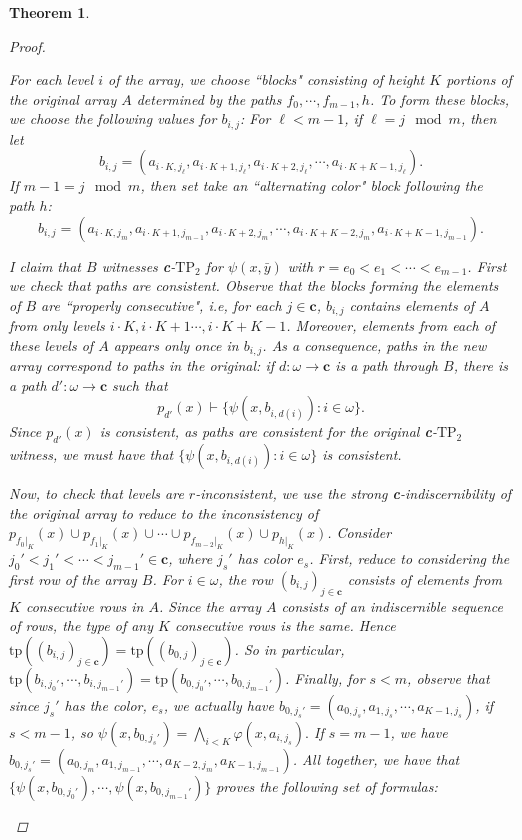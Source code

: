 \documentclass{article}
\newcommand{\tp}{\text{tp}}
\newcommand{\TPii}{\text{TP}_2}
\newcommand{\vphi}{\varphi}
\newtheorem{theorem}{Theorem}
\theoremstyle{definition}
\theoremstyle{definition}
\theoremstyle{definition}
\theoremstyle{definition}
\begin{document}
\begin{theorem}
\begin{proof}
\begin{enumerate}
        For each level $i$ of the array, we choose ``blocks" consisting of height $K$ portions of the original array $A$ determined by the paths $f_0,\dotsm, f_{m-1}, h$. To form these blocks, we choose the following values for $b_{i,j}$: For $\ell< m-1$, if $\ell=j\mod m$, then let $$b_{i,j}=(a_{i\cdot K, j_\ell},a_{i\cdot K+1,j_\ell}, a_{i\cdot K+2, j_\ell},\dotsm, a_{i\cdot K+K-1,j_\ell}).$$ If $m-1=j\mod m$, then set take an ``alternating color" block following the path $h$: $$b_{i,j}=(a_{i\cdot K, j_m},a_{i\cdot K+1,j_{m-1}}, a_{i\cdot K+2, j_m},\dotsm, a_{i\cdot K+K-2,j_m}, a_{i\cdot K+K-1, j_{m-1}}).$$

        I claim that $B$ witnesses \textbf{c}-$\TPii$ for $\psi(x,\bar{y})$ with $r=e_0<e_1<\dotsm<e_{m-1}$. First we check that paths are consistent. Observe that the blocks forming the elements of $B$ are ``properly consecutive", i.e, for each $j\in \textbf{c}$, $b_{i,j}$ contains elements of $A$ from only levels $i\cdot K, i\cdot K+1\dotsm, i\cdot K+K-1$. Moreover, elements from each of these levels of $A$ appears only once in $b_{i,j}$. As a consequence, paths in the new array correspond to paths in the original: if $d\colon \omega\to \textbf{c}$ is a path through $B$, there is a path $d'\colon \omega\to \textbf{c}$ such that $$p_{d'}(x)\vdash\{\psi(x, b_{i,d(i)})\colon i\in \omega\}.$$ Since $p_{d'}(x)$ is consistent, as paths are consistent for the original \textbf{c}-$\TPii$ witness, we must have that $\{\psi(x, b_{i,d(i)})\colon i\in \omega\}$ is consistent. 
        
        Now, to check that levels are $r$-inconsistent, we use the strong \textbf{c}-indiscernibility of the original array to reduce to the inconsistency of $p_{f_0|_K}(x)\cup p_{f_1|_K}(x)\cup\dotsm\cup p_{f_{m-2}|_K}(x)\cup p_{h|_K}(x)$. Consider $j_0'<j_1'<\dotsm<j_{m-1}'\in \textbf{c}$, where $j_s'$ has color $e_s$. First, reduce to considering the first row of the array $B$. For $i\in\omega$, the row $(b_{i,j})_{j\in \textbf{c}}$ consists of elements from $K$ consecutive rows in $A$. Since the array $A$ consists of an indiscernible sequence of rows, the type of any $K$ consecutive rows is the same. Hence $\tp((b_{i,j})_{j\in \textbf{c}})=\tp((b_{0,j})_{j\in \textbf{c}})$. So in particular, $\tp(b_{i,j_0'},\dotsm, b_{i,j_{m-1}'})=\tp(b_{0,j_0'},\dotsm, b_{0,j_{m-1}'})$. Finally, for $s<m$, observe that since $j_s'$ has the color, $e_s$, we actually have  $b_{0,j_s'}=(a_{0, j_s},a_{1,j_s},\dotsm, a_{K-1,j_s})$, if $s<m-1$, so $\psi(x,b_{0,j_s'})=\bigwedge_{i<K}\vphi(x,a_{i,j_s}).$ If $s=m-1$, we have $b_{0,j_s'}=(a_{0, j_m},a_{1,j_{m-1}},\dotsm, a_{K-2,j_m},a_{K-1,j_{m-1}})$. All together, we have that
        $\{\psi(x,b_{0,j_0'}),\dotsm, \psi(x, b_{0,j_{m-1}'})\}$ proves the following set of formulas:
        

\end{enumerate}
\end{proof}
\end{theorem}
\end{document}
